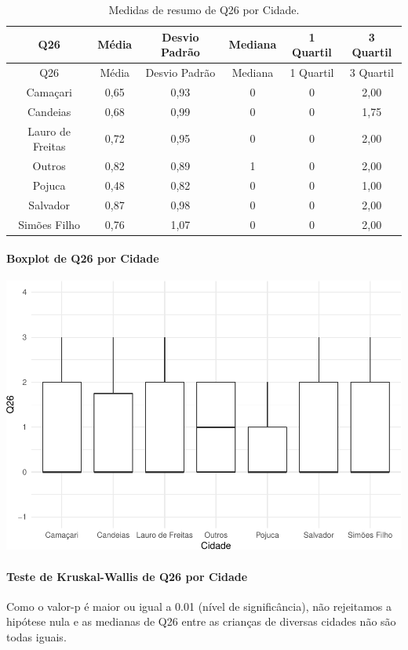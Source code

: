 \documentclass[]{article}
\let\oldparagraph\paragraph
\renewcommand{\paragraph}[1]{\oldparagraph{#1}\mbox{}}
\begin{document}
\begin{longtable}[]{@{}cccccc@{}}
\caption{\label{tab:unnamed-chunk-724}Medidas de resumo de Q26 por Cidade.}\tabularnewline
\toprule
Q26 & Média & Desvio Padrão & Mediana & 1 Quartil & 3 Quartil\tabularnewline
\midrule
\endfirsthead
\toprule
Q26 & Média & Desvio Padrão & Mediana & 1 Quartil & 3 Quartil\tabularnewline
\midrule
\endhead
Camaçari & 0,65 & 0,93 & 0 & 0 & 2,00\tabularnewline
Candeias & 0,68 & 0,99 & 0 & 0 & 1,75\tabularnewline
Lauro de Freitas & 0,72 & 0,95 & 0 & 0 & 2,00\tabularnewline
Outros & 0,82 & 0,89 & 1 & 0 & 2,00\tabularnewline
Pojuca & 0,48 & 0,82 & 0 & 0 & 1,00\tabularnewline
Salvador & 0,87 & 0,98 & 0 & 0 & 2,00\tabularnewline
Simões Filho & 0,76 & 1,07 & 0 & 0 & 2,00\tabularnewline
\bottomrule
\end{longtable}

\hypertarget{boxplot-de-q26-por-cidade}{%
\paragraph{Boxplot de Q26 por Cidade}\label{boxplot-de-q26-por-cidade}}

\begin{center}\includegraphics[width=0.75\linewidth]{relatorio_covid19_files/figure-latex/unnamed-chunk-725-1} \end{center}

\hypertarget{teste-de-kruskal-wallis-de-q26-por-cidade}{%
\paragraph{Teste de Kruskal-Wallis de Q26 por Cidade}\label{teste-de-kruskal-wallis-de-q26-por-cidade}}

Como o valor-p é maior ou igual a 0.01 (nível de significância), não rejeitamos a hipótese nula e as medianas de Q26 entre as crianças de diversas cidades não são todas iguais.
\end{document}
